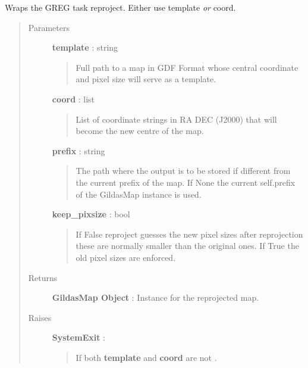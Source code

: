 \documentclass[a4paper,10pt,english]{sphinxmanual}
\begin{document}
\begin{fulllineitems}
\begin{fulllineitems}
\end{fulllineitems}


\begin{fulllineitems}
\label{maps:astrolyze.maps.gildas.GildasMap.reproject}
Wraps the GREG task reproject. Either use template \emph{or} coord.
\begin{quote}\begin{description}
\item[{Parameters }] \leavevmode
\textbf{template} : string
\begin{quote}

Full path to a map in GDF Format whose central
coordinate and pixel size will serve as a template.
\end{quote}

\textbf{coord} : list
\begin{quote}

List of coordinate strings in RA DEC (J2000) that
will become the new centre of the map.
\end{quote}

\textbf{prefix} : string
\begin{quote}

The path where the output is to be stored if different
from the current prefix of the map. If None the current
self.prefix of the GildasMap instance is used.
\end{quote}

\textbf{keep\_pixsize} : bool
\begin{quote}

If False reproject guesses the new pixel sizes after reprojection
these are normally smaller than the original ones.
If True the old pixel sizes are enforced.
\end{quote}

\item[{Returns }] \leavevmode
\textbf{GildasMap Object} : Instance for the reprojected map.

\item[{Raises }] \leavevmode
\textbf{SystemExit} :
\begin{quote}

If both \textbf{template} and \textbf{coord} are not .
\end{quote}


\end{description}
\end{quote}
\end{fulllineitems}
\end{fulllineitems}
\end{document}
